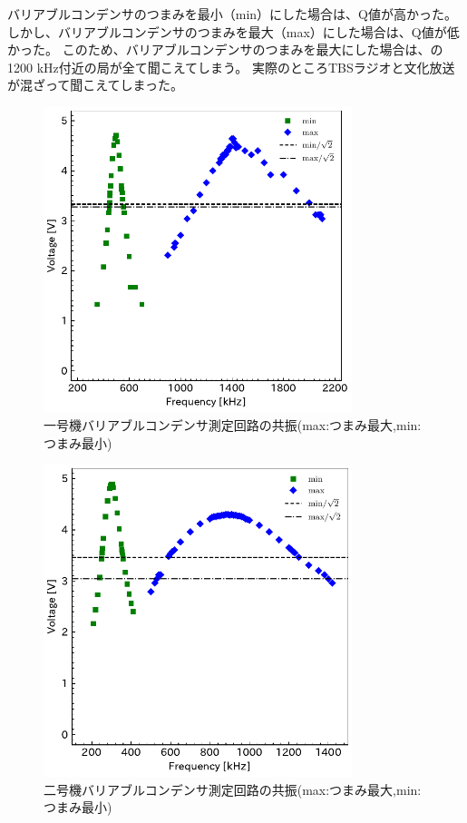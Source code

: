 \documentclass[report.tex]{subfiles}
\begin{document}
バリアブルコンデンサのつまみを最小（min）にした場合は、Q値が高かった。
しかし、バリアブルコンデンサのつまみを最大（max）にした場合は、Q値が低かった。
このため、バリアブルコンデンサのつまみを最大にした場合は、の1200 kHz付近の局が全て聞こえてしまう。
実際のところTBSラジオと文化放送が混ざって聞こえてしまった。

\begin{figure}[H]
	\centering
	\includegraphics[width=9cm]{fig/min_max_v2.pdf}
	\caption{一号機バリアブルコンデンサ測定回路の共振(max:つまみ最大,min:つまみ最小)}
	\label{fig:inda4}
\end{figure}

\begin{figure}[H]
	\centering
	\includegraphics[width=9cm]{fig/min_max2_v2.pdf}
	\caption{二号機バリアブルコンデンサ測定回路の共振(max:つまみ最大,min:つまみ最小)}
	\label{fig:inda5}
\end{figure}
\end{document}
